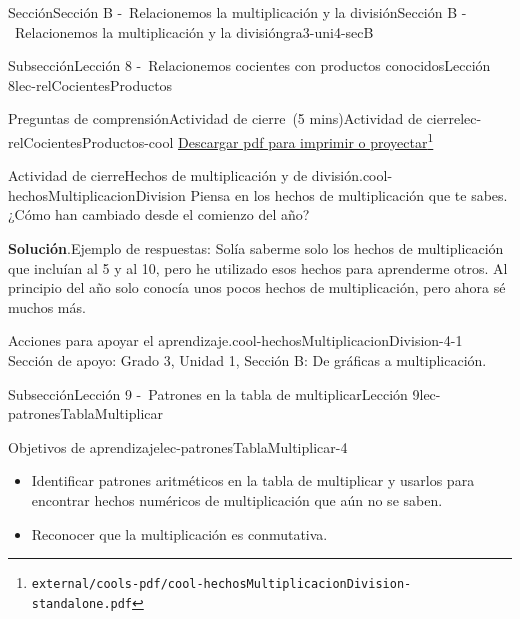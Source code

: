 \documentclass[oneside,10pt,]{article}
\newcommand{\blocktitlefont}{\relax}
\begin{document}
\begin{sectionptx}{Sección}{Sección B -~Relacionemos la multiplicación y la división}{}{Sección B -~Relacionemos la multiplicación y la división}{}{}{gra3-uni4-secB}
\begin{subsectionptx}{Subsección}{Lección 8 -~Relacionemos cocientes con productos conocidos}{}{Lección 8}{}{}{lec-relCocientesProductos}
%
\begin{reading-questions-subsubsection}{Preguntas de comprensión}{Actividad de cierre~(5 mins)}{}{Actividad de cierre}{}{}{lec-relCocientesProductos-cool}
\href{external/cools-pdf/cool-hechosMultiplicacionDivision-standalone.pdf}{Descargar pdf para imprimir o proyectar}\footnote{\nolinkurl{external/cools-pdf/cool-hechosMultiplicacionDivision-standalone.pdf}\label{lec-relCocientesProductos-cool-5}}\begin{project}{Actividad de cierre}{Hechos de multiplicación y de división.}{cool-hechosMultiplicacionDivision}%
Piensa en los hechos de multiplicación que te sabes. ¿Cómo han cambiado desde el comienzo del año?%
\par\smallskip%
\noindent\textbf{\blocktitlefont Solución}.\hypertarget{cool-hechosMultiplicacionDivision-3}{}\quad{}Ejemplo de respuestas: Solía saberme solo los hechos de multiplicación que incluían al 5 y al 10, pero he utilizado esos hechos para aprenderme otros. Al principio del año solo conocía unos pocos hechos de multiplicación, pero ahora sé muchos más.%
\end{project}%
\par
\begin{paragraphs}{Acciones para apoyar el aprendizaje.}{cool-hechosMultiplicacionDivision-4-1}%
Sección de apoyo: Grado 3, Unidad 1, Sección B: De gráficas a multiplicación.%
\end{paragraphs}%
\end{reading-questions-subsubsection}
\end{subsectionptx}
%
%
\typeout{************************************************}
\typeout{************************************************}
%
\begin{subsectionptx}{Subsección}{Lección 9 -~Patrones en la tabla de multiplicar}{}{Lección 9}{}{}{lec-patronesTablaMultiplicar}
\begin{objectives}{Objetivos de aprendizaje}{lec-patronesTablaMultiplicar-4}
%
\begin{itemize}[label=\textbullet]
\item{}Identificar patrones aritméticos en la tabla de multiplicar y usarlos para encontrar hechos numéricos de multiplicación que aún no se saben.%
\item{}Reconocer que la multiplicación es conmutativa.%
\end{itemize}
\end{objectives}
\begin{introduction}{}%

\end{introduction}
\end{subsectionptx}
\end{sectionptx}
\end{document}
